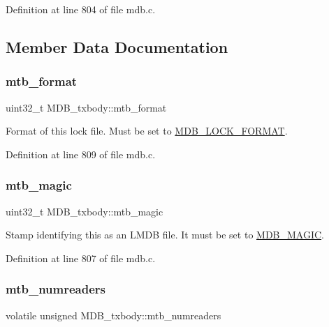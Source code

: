 Definition at line 804 of file mdb.\+c.



\subsection{Member Data Documentation}
\mbox{\label{struct_m_d_b__txbody_aad8e50c2b4e26c5aba42ec028f43d939}} 
\subsubsection{\texorpdfstring{mtb\+\_\+format}{mtb\_format}}
{\footnotesize\ttfamily uint32\+\_\+t M\+D\+B\+\_\+txbody\+::mtb\+\_\+format}

Format of this lock file. Must be set to \mbox{\hyperlink{group__readers_gabb6423d38a9132eedb4f2e2be72b8aeb}{M\+D\+B\+\_\+\+L\+O\+C\+K\+\_\+\+F\+O\+R\+M\+AT}}. 

Definition at line 809 of file mdb.\+c.

\mbox{\label{struct_m_d_b__txbody_ada53ed82f4a10575e96a6d2e48da3c9a}} 
\subsubsection{\texorpdfstring{mtb\+\_\+magic}{mtb\_magic}}
{\footnotesize\ttfamily uint32\+\_\+t M\+D\+B\+\_\+txbody\+::mtb\+\_\+magic}

Stamp identifying this as an L\+M\+DB file. It must be set to \mbox{\hyperlink{group__internal_ga4cac6326c08147a019e8ddb17ad712f6}{M\+D\+B\+\_\+\+M\+A\+G\+IC}}. 

Definition at line 807 of file mdb.\+c.

\mbox{\label{struct_m_d_b__txbody_a64a149ee48c8290e884c052a54696c9a}} 
\subsubsection{\texorpdfstring{mtb\+\_\+numreaders}{mtb\_numreaders}}
{\footnotesize\ttfamily volatile unsigned M\+D\+B\+\_\+txbody\+::mtb\+\_\+numreaders}

